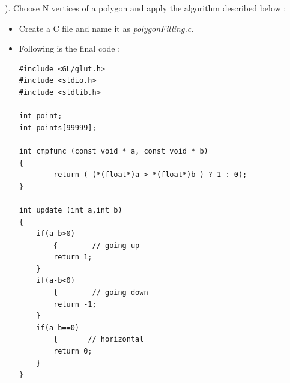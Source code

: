 \vspace{0.5mm} ). Choose N vertices of a polygon and apply the algorithm  described below :
\begin{itemize}
\item Create a C file and name it as \textit{polygonFilling.c}.
\item Following is the final code :
\begin{lstlisting}
#include <GL/glut.h>
#include <stdio.h>
#include <stdlib.h>

int point;
int points[99999];

int cmpfunc (const void * a, const void * b)
{
        return ( (*(float*)a > *(float*)b ) ? 1 : 0);
}

int update (int a,int b)
{
	if(a-b>0)
        {        // going up
		return 1;
	}
	if(a-b<0)
        {        // going down
		return -1;
	}
	if(a-b==0)
        {       // horizontal
		return 0;
	}
}


\end{lstlisting}
\end{itemize}

